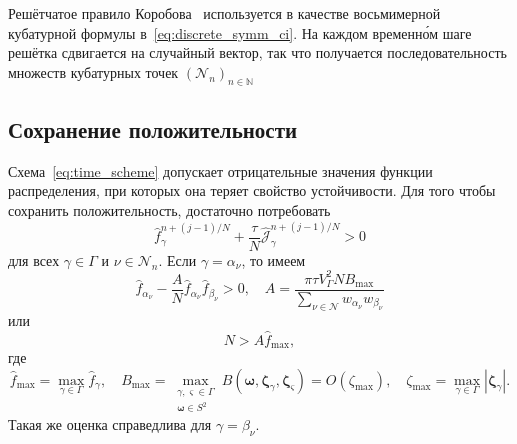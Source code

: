 \documentclass[
aps,%
12pt,%
final,%
notitlepage,%
oneside,%
onecolumn,%
nobibnotes,%
nofootinbib,%
superscriptaddress,%
noshowpacs,%
showkeys,%
floatfix,%
tightenlines,%
centertags]%
{revtex4}
\newcommand{\bzeta}{\boldsymbol{\zeta}}
\newcommand{\Nu}{\mathcal{N}}
\newcommand{\OO}[1]{O(#1)}
\begin{document}
Решётчатое правило Коробова~\citep{Korobov1959, Sloan1994} используется в качестве
восьмимерной кубатурной формулы в~\eqref{eq:discrete_symm_ci}.
На каждом временн\'{о}м шаге решётка сдвигается на случайный вектор,
так что получается последовательность множеств кубатурных точек \((\Nu_n)_{n\in\mathbb{N}}\)

\subsection{Сохранение положительности}

Схема~\eqref{eq:time_scheme} допускает отрицательные значения функции распределения,
при которых она теряет свойство устойчивости.
Для того чтобы сохранить положительность, достаточно потребовать
\begin{equation}\label{eq:positive_f}
    \hat{f}_\gamma^{n+(j-1)/N} + \frac{\tau}N \hat{\mathscr{J}}_\gamma^{n+(j-1)/N} > 0
\end{equation}
для всех \(\gamma\in\Gamma\) и \(\nu\in\Nu_n\).
Если \(\gamma = \alpha_\nu\), то имеем
\begin{equation}\label{eq:positive_f_alpha}
    \hat{f}_{\alpha_\nu} - \frac{A}{N}\hat{f}_{\alpha_\nu}\hat{f}_{\beta_\nu} > 0, \quad
    A = \frac{\pi\tau V_\Gamma^2 N B_{\max}}{\sum_{\nu\in\Nu} w_{\alpha_\nu}w_{\beta_\nu}}
\end{equation}
или
\begin{equation}\label{eq:positive_f_alpha2}
    N > A \hat{f}_{\max},
\end{equation}
где
\begin{equation}\label{eq:f_B_max}
    \hat{f}_{\max} = \max_{\gamma\in\Gamma} \hat{f}_\gamma, \quad
    B_{\max} = \max_{\substack{\gamma,\varsigma\in\Gamma\\\boldsymbol{\omega}\in S^2}}
        B(\boldsymbol{\omega}, \bzeta_{\gamma}, \bzeta_{\varsigma}) = \OO{\zeta_{\max}}, \quad
    \zeta_{\max} = \max_{\gamma\in\Gamma}|\bzeta_\gamma|.
\end{equation}
Такая же оценка справедлива для \(\gamma = \beta_\nu\).
\end{document}
